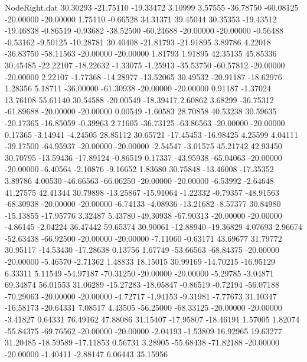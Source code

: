 \begin{filecontents}{NodeRight.dat}
  30.30293  -21.75110  -19.33472     3.10999    3.57555  -36.78750  -60.08125  -20.00000  -20.00000    1.75110   -0.66528   34.31371   39.45044
  30.35353  -19.43512  -19.46838    -0.86519   -0.93682  -38.52500  -60.24688  -20.00000  -20.00000   -0.56488   -0.53162   -9.50125  -10.28781
  30.40408  -21.81793  -21.91895     3.89786    4.22018  -36.83750  -58.11563  -20.00000  -20.00000    1.81793    1.91895   42.35135   45.85336
  30.45485  -22.22107  -18.22632    -1.33075   -1.25913  -35.53750  -60.57812  -20.00000  -20.00000    2.22107   -1.77368  -14.28977  -13.52065
  30.49532  -20.91187  -18.62976     1.28356    5.18711  -36.00000  -61.30938  -20.00000  -20.00000    0.91187   -1.37024   13.76108   55.61140
  30.54588  -20.00549  -18.39417     2.60862    3.68299  -36.75312  -61.89688  -20.00000  -20.00000    0.00549   -1.60583   28.70858   40.53238
  30.59635  -20.17365  -16.85059    -0.39963    2.71605  -36.73125  -63.86563  -20.00000  -20.00000    0.17365   -3.14941   -4.24505   28.85112
  30.65721  -17.45453  -16.98425     4.25599    4.04111  -39.17500  -64.95937  -20.00000  -20.00000   -2.54547   -3.01575   45.21742   42.93450
  30.70795  -13.59436  -17.89124    -0.86519    0.17337  -43.95938  -65.04063  -20.00000  -20.00000   -6.40564   -2.10876   -9.16652    1.83680
  30.75848  -13.46008  -17.35352     3.89786    4.00530  -46.66563  -66.06250  -20.00000  -20.00000   -6.53992   -2.64648   41.27575   42.41344
  30.79898  -13.25867  -15.91064    -1.22332   -0.79357  -48.91563  -68.30938  -20.00000  -20.00000   -6.74133   -4.08936  -13.21682   -8.57377
  30.84980  -15.13855  -17.95776     3.32487    5.43780  -49.30938  -67.90313  -20.00000  -20.00000   -4.86145   -2.04224   36.47442   59.65374
  30.90061  -12.88940  -19.36829     4.07693    2.96674  -52.63438  -66.92500  -20.00000  -20.00000   -7.11060   -0.63171   43.69677   31.79772
  30.95117  -14.53430  -17.28638     0.13756    1.67749  -53.66563  -68.84375  -20.00000  -20.00000   -5.46570   -2.71362    1.48833   18.15015
  30.99169  -14.70215  -16.95129     6.33311    5.11549  -54.97187  -70.31250  -20.00000  -20.00000   -5.29785   -3.04871   69.34874   56.01553
  31.06289  -15.27283  -18.05847    -0.86519   -0.72194  -56.07188  -70.29063  -20.00000  -20.00000   -4.72717   -1.94153   -9.31981   -7.77673
  31.10347  -16.58173  -20.64331     7.08517    4.43505  -56.25000  -68.33125  -20.00000  -20.00000   -3.41827    0.64331   76.49162   47.88086
  31.15407  -17.95807  -18.46191     1.57005    1.82074  -55.84375  -69.76562  -20.00000  -20.00000   -2.04193   -1.53809   16.92965   19.63277
  31.20485  -18.59589  -17.11853     0.56731    3.28905  -55.68438  -71.82188  -20.00000  -20.00000   -1.40411   -2.88147    6.06443   35.15956

\end{filecontents}
